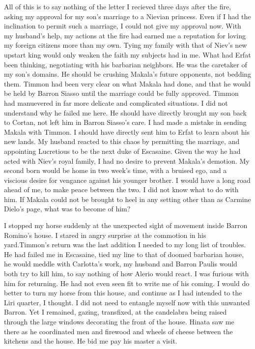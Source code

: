 \documentclass{article}
\begin{document}
All of this is to say nothing of the letter I recieved three days after the fire, asking my approval for my son's marriage to a Nievian princess. Even if I had the inclination to permit such a marriage, I could not give my approval now. With my husband's help, my actions at the fire had earned me a reputation for loving my foreign citizens more than my own. Tying my family with that of Niev's new upstart king would only weaken the faith my subjects had in me. What had Erfat been thinking, negotiating with his barbarian neighbors. He was the caretaker of my son's domains. He should be crushing Makala's future opponents, not bedding them. Timmon had been very clear on what Makala had done, and that he would be held by Barron Siasso until the marriage could be fully approved. Timmon had manuevered in far more delicate and complicated situations. I did not understand why he failed me here. He should have directly brought my son back to Cortan, not left him in Barron Siasso's care. I had made a mistake in sending Makala with Timmon. I should have directly sent him to Erfat to learn about his new lands. My husband reacted to this chaos by permitting the marriage, and appointing Lucretious to be the next duke of Escasaine. Given the way he had acted with Niev's royal family, I had no desire to prevent Makala's demotion. My second born would be home in two week's time, with a bruised ego, and a viscious desire for vengance against his younger brother. I would have a long road ahead of me, to make peace between the two. I did not know what to do with him. If Makala could not be brought to heel in any setting other than as Carmine Dielo's page, what was to become of him?

I stopped my horse suddenly at the unexpected sight of movement inside Barron Romino's house. I stared in angry surprise at the commotion in his yard.Timmon's return was the last addition I needed to my long list of troubles. He had failed me in Escasaine, tied my line to that of doomed barbarian house, he would meddle with Carlotta's work, my husband and Barron Paulis would both try to kill him, to say nothing of how Alerio would react. I was furious with him for returning. He had not even seen fit to write me of his coming. I would do better to turn my horse from this house, and continue  as I had intended to the Liri quarter, I thought. I did not need to entangle myself now with this unwanted Barron. Yet I remained, gazing, transfixed, at the candelabra being raised through the large windows decorating the front of the house. Hinata saw me there as he coordinated men and firewood and wheels of cheese between the kitchens and the house. He bid me pay his master a visit.
\end{document}
